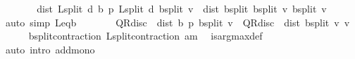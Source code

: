 \begin{isabellebody}
\ \ \isamarkupfalse%
\ \isamarkupfalse%
\ {\isachardoublequoteopen}{\isasymdots}\ {\isacharequal}{\kern0pt}\ dist\ {\isacharparenleft}{\kern0pt}L{\isacharunderscore}{\kern0pt}split\ d\ {\isacharparenleft}{\kern0pt}{\isasymnu}\isactrlsub b\ {\isacharquery}{\kern0pt}p{\isacharparenright}{\kern0pt}{\isacharparenright}{\kern0pt}\ {\isacharparenleft}{\kern0pt}L{\isacharunderscore}{\kern0pt}split\ d\ {\isacharparenleft}{\kern0pt}{\isasymL}\isactrlsub b{\isacharunderscore}{\kern0pt}split\ v{\isacharparenright}{\kern0pt}{\isacharparenright}{\kern0pt}\ {\isacharplus}{\kern0pt}\ dist\ {\isacharparenleft}{\kern0pt}{\isasymL}\isactrlsub b{\isacharunderscore}{\kern0pt}split\ {\isacharparenleft}{\kern0pt}{\isasymL}\isactrlsub b{\isacharunderscore}{\kern0pt}split\ v{\isacharparenright}{\kern0pt}{\isacharparenright}{\kern0pt}\ {\isacharparenleft}{\kern0pt}{\isasymL}\isactrlsub b{\isacharunderscore}{\kern0pt}split\ v{\isacharparenright}{\kern0pt}{\isachardoublequoteclose}\isanewline
\ \ \ \ \isamarkupfalse%
\ {\isacharparenleft}{\kern0pt}auto\ simp{\isacharcolon}{\kern0pt}\ L{\isacharunderscore}{\kern0pt}eq{\isacharunderscore}{\kern0pt}{\isasymL}\isactrlsub b{\isacharparenright}{\kern0pt}\isanewline
\ \ \isamarkupfalse%
\ \isamarkupfalse%
\ {\isachardoublequoteopen}{\isasymdots}\ {\isasymle}\ QR{\isacharunderscore}{\kern0pt}disc\ {\isacharasterisk}{\kern0pt}\ dist\ {\isacharparenleft}{\kern0pt}{\isasymnu}\isactrlsub b\ {\isacharquery}{\kern0pt}p{\isacharparenright}{\kern0pt}\ {\isacharparenleft}{\kern0pt}{\isasymL}\isactrlsub b{\isacharunderscore}{\kern0pt}split\ v{\isacharparenright}{\kern0pt}\ {\isacharplus}{\kern0pt}\ QR{\isacharunderscore}{\kern0pt}disc\ {\isacharasterisk}{\kern0pt}\ dist\ {\isacharparenleft}{\kern0pt}{\isasymL}\isactrlsub b{\isacharunderscore}{\kern0pt}split\ v{\isacharparenright}{\kern0pt}\ v{\isachardoublequoteclose}\isanewline
\ \ \ \ \isamarkupfalse%
\ {\isasymL}\isactrlsub b{\isacharunderscore}{\kern0pt}split{\isacharunderscore}{\kern0pt}contraction\ L{\isacharunderscore}{\kern0pt}split{\isacharunderscore}{\kern0pt}contraction\ am\ \isamarkupfalse%
\ is{\isacharunderscore}{\kern0pt}arg{\isacharunderscore}{\kern0pt}max{\isacharunderscore}{\kern0pt}def\isanewline
\ \ \ \ \isamarkupfalse%
\ {\isacharparenleft}{\kern0pt}auto\ intro{\isacharbang}{\kern0pt}{\isacharcolon}{\kern0pt}\ add{\isacharunderscore}{\kern0pt}mono{\isacharparenright}{\kern0pt}\isanewline
\ \ \isamarkupfalse%
\ \isamarkupfalse%

\end{isabellebody}
